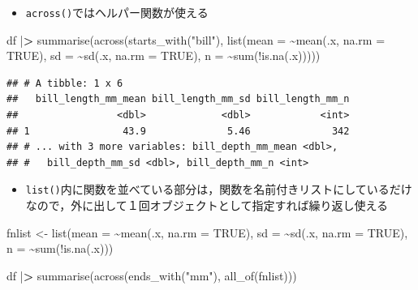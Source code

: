\documentclass[
  xelatex,ja=standard, b5paper]{bxjsbook}
\newenvironment{Shaded}{\begin{snugshade}}{\end{snugshade}}
\newcommand{\AttributeTok}[1]{\textcolor[rgb]{0.77,0.63,0.00}{#1}}
\newcommand{\ConstantTok}[1]{\textcolor[rgb]{0.00,0.00,0.00}{#1}}
\newcommand{\ErrorTok}[1]{\textcolor[rgb]{0.64,0.00,0.00}{\textbf{#1}}}
\newcommand{\FunctionTok}[1]{\textcolor[rgb]{0.00,0.00,0.00}{#1}}
\newcommand{\NormalTok}[1]{#1}
\newcommand{\OtherTok}[1]{\textcolor[rgb]{0.56,0.35,0.01}{#1}}
\newcommand{\SpecialCharTok}[1]{\textcolor[rgb]{0.00,0.00,0.00}{#1}}
\newcommand{\StringTok}[1]{\textcolor[rgb]{0.31,0.60,0.02}{#1}}
\providecommand{\tightlist}{%
  \setlength{\itemsep}{0pt}\setlength{\parskip}{0pt}}
\begin{document}
\begin{itemize}
\tightlist
\item
  \texttt{across()}ではヘルパー関数が使える
\end{itemize}

\begin{Shaded}
\begin{Highlighting}[]
\NormalTok{df }\SpecialCharTok{|}\ErrorTok{\textgreater{}} 
  \FunctionTok{summarise}\NormalTok{(}\FunctionTok{across}\NormalTok{(}\FunctionTok{starts\_with}\NormalTok{(}\StringTok{"bill"}\NormalTok{),}
                   \FunctionTok{list}\NormalTok{(}\AttributeTok{mean =} \SpecialCharTok{\textasciitilde{}}\FunctionTok{mean}\NormalTok{(.x, }\AttributeTok{na.rm =} \ConstantTok{TRUE}\NormalTok{),}
                        \AttributeTok{sd =} \SpecialCharTok{\textasciitilde{}}\FunctionTok{sd}\NormalTok{(.x, }\AttributeTok{na.rm =} \ConstantTok{TRUE}\NormalTok{),}
                        \AttributeTok{n =} \SpecialCharTok{\textasciitilde{}}\FunctionTok{sum}\NormalTok{(}\SpecialCharTok{!}\FunctionTok{is.na}\NormalTok{(.x)))))}
\end{Highlighting}
\end{Shaded}

\begin{verbatim}
## # A tibble: 1 x 6
##   bill_length_mm_mean bill_length_mm_sd bill_length_mm_n
##                 <dbl>             <dbl>            <int>
## 1                43.9              5.46              342
## # ... with 3 more variables: bill_depth_mm_mean <dbl>,
## #   bill_depth_mm_sd <dbl>, bill_depth_mm_n <int>
\end{verbatim}

\begin{itemize}
\tightlist
\item
  \texttt{list()}内に関数を並べている部分は，関数を名前付きリストにしているだけなので，外に出して１回オブジェクトとして指定すれば繰り返し使える
\end{itemize}

\begin{Shaded}
\begin{Highlighting}[]
\NormalTok{fnlist }\OtherTok{\textless{}{-}} 
  \FunctionTok{list}\NormalTok{(}\AttributeTok{mean =} \SpecialCharTok{\textasciitilde{}}\FunctionTok{mean}\NormalTok{(.x, }\AttributeTok{na.rm =} \ConstantTok{TRUE}\NormalTok{),}
       \AttributeTok{sd =} \SpecialCharTok{\textasciitilde{}}\FunctionTok{sd}\NormalTok{(.x, }\AttributeTok{na.rm =} \ConstantTok{TRUE}\NormalTok{),}
       \AttributeTok{n =} \SpecialCharTok{\textasciitilde{}}\FunctionTok{sum}\NormalTok{(}\SpecialCharTok{!}\FunctionTok{is.na}\NormalTok{(.x)))}


\NormalTok{df }\SpecialCharTok{|}\ErrorTok{\textgreater{}} 
  \FunctionTok{summarise}\NormalTok{(}\FunctionTok{across}\NormalTok{(}\FunctionTok{ends\_with}\NormalTok{(}\StringTok{"mm"}\NormalTok{),}
                   \FunctionTok{all\_of}\NormalTok{(fnlist)))}
\end{Highlighting}
\end{Shaded}
\end{document}
